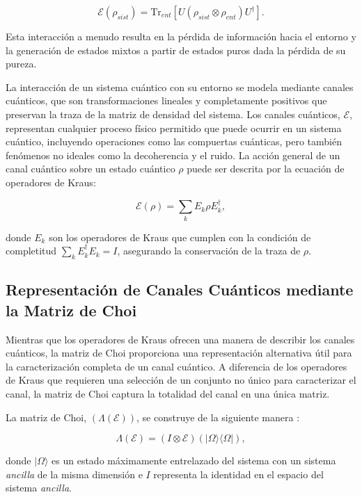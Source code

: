 \documentclass[11pt, spanish, letterpage]{report} %
\newcommand{\1}{\mathbb{1}}
\begin{document}
\begin{equation}
    \mathcal{E}(\rho_{sist}) = \text{Tr}_{ent}[ U( \rho_{sist} \otimes \rho_{ent} ) U^\dagger ].
\end{equation}

Esta interacción a menudo resulta en la pérdida de información hacia el entorno y la generación de estados mixtos a partir de estados puros dada la pérdida de su pureza. 

La interacción de un sistema cuántico con su entorno se modela mediante canales cuánticos, que son transformaciones lineales y completamente positivos que preservan la traza de la matriz de densidad del sistema. Los canales cuánticos, $\mathcal{E}$, representan cualquier proceso físico permitido que puede ocurrir en un sistema cuántico, incluyendo operaciones como las compuertas cuánticas, pero también fenómenos no ideales como la decoherencia y el ruido. La acción general de un canal cuántico sobre un estado cuántico $\rho$ puede ser descrita por la ecuación de operadores de Kraus:

\begin{equation}
\mathcal{E}(\rho) = \sum_k E_k \rho E_k^\dagger,
\end{equation}

donde $E_k$ son los operadores de Kraus que cumplen con la condición de completitud $\sum_k E_k^\dagger E_k = I$, asegurando la conservación de la traza de $\rho$.

\subsection{Representación de Canales Cuánticos mediante la Matriz de Choi}

Mientras que los operadores de Kraus ofrecen una manera de describir los canales cuánticos, la matriz de Choi proporciona una representación alternativa útil para la caracterización completa de un canal cuántico. A diferencia de los operadores de Kraus que requieren una selección de un conjunto no único para caracterizar el canal, la matriz de Choi captura la totalidad del canal en una única matriz. 

La matriz de Choi, $(\Lambda(\mathcal{E}))$, se construye de la siguiente manera \cite{QProcess}:

\begin{equation} 
\Lambda(\mathcal{E}) = (I \otimes \mathcal{E})(|\Omega\rangle\langle\Omega|),
\end{equation} 

donde $|\Omega\rangle$ es un estado máximamente entrelazado del sistema con un sistema \textit{ancilla} de la misma dimensión e $I$ representa la identidad en el espacio del sistema \textit{ancilla}.
\end{document}
